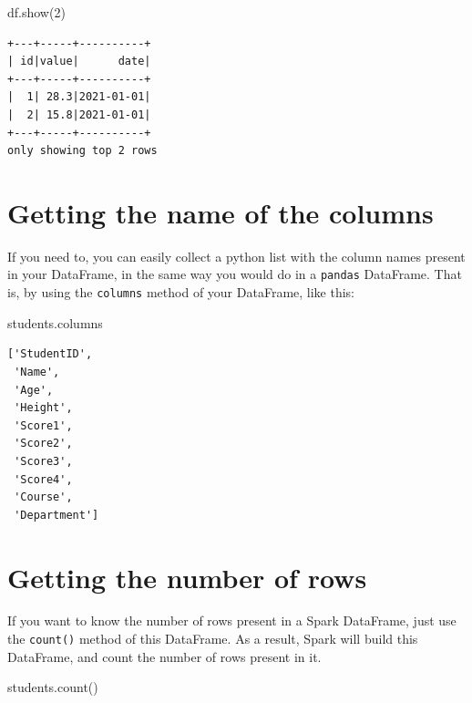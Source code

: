 \documentclass[
  11pt,
  letterpaper,
  DIV=11,
  numbers=noendperiod]{scrreprt}
\newenvironment{Shaded}{\begin{snugshade}}{\end{snugshade}}
\newcommand{\DecValTok}[1]{\textcolor[rgb]{0.68,0.00,0.00}{#1}}
\newcommand{\NormalTok}[1]{\textcolor[rgb]{0.00,0.23,0.31}{#1}}
\begin{document}
\begin{Shaded}
\begin{Highlighting}[]
\NormalTok{df.show(}\DecValTok{2}\NormalTok{)}
\end{Highlighting}
\end{Shaded}

\begin{verbatim}
+---+-----+----------+
| id|value|      date|
+---+-----+----------+
|  1| 28.3|2021-01-01|
|  2| 15.8|2021-01-01|
+---+-----+----------+
only showing top 2 rows
\end{verbatim}

\hypertarget{getting-the-name-of-the-columns}{%
\section{Getting the name of the
columns}\label{getting-the-name-of-the-columns}}

If you need to, you can easily collect a python list with the column
names present in your DataFrame, in the same way you would do in a
\texttt{pandas} DataFrame. That is, by using the \texttt{columns} method
of your DataFrame, like this:

\begin{Shaded}
\begin{Highlighting}[]
\NormalTok{students.columns}
\end{Highlighting}
\end{Shaded}

\begin{verbatim}
['StudentID',
 'Name',
 'Age',
 'Height',
 'Score1',
 'Score2',
 'Score3',
 'Score4',
 'Course',
 'Department']
\end{verbatim}

\hypertarget{getting-the-number-of-rows}{%
\section{Getting the number of rows}\label{getting-the-number-of-rows}}

If you want to know the number of rows present in a Spark DataFrame,
just use the \texttt{count()} method of this DataFrame. As a result,
Spark will build this DataFrame, and count the number of rows present in
it.

\begin{Shaded}
\begin{Highlighting}[]
\NormalTok{students.count()}
\end{Highlighting}
\end{Shaded}
\end{document}

